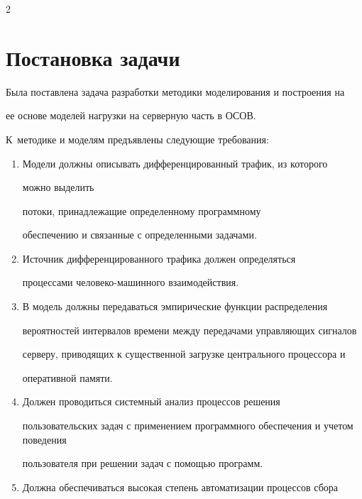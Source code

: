 \begin{multicols}{2}
\begin{figure}[b]
 \vspace*{-9pt}


\end{figure}

  

\section{Постановка задачи}

  

  Была поставлена задача разработки методики моделирования и построения на 

ее основе моделей нагрузки на серверную часть в ОСОВ. 

К~методике и моделям предъявлены следующие требования:

  \begin{enumerate}[1.]

\item Модели должны описывать дифференци\-ро\-ванный трафик, из которого 

можно выделить\linebreak

 потоки, принадлежащие определенному программному 

обеспечению и связанные с определенными задачами.

\item Источник дифференцированного трафика должен определяться 

процессами человеко-ма\-шин\-но\-го взаимодействия.

\item В модель должны передаваться эмпирические функции распределения 

вероятностей интервалов времени между передачами управляющих сигналов 

серверу, приводящих к существенной загрузке центрального процессора и 

оперативной памяти.

\item Должен проводиться системный анализ процессов решения 

пользовательских задач с применением программного обеспечения и учетом поведения 

пользователя при решении задач с по\-мощью программ.

\item Должна обеспечиваться высокая степень автоматизации процессов сбора 


\end{enumerate}
\end{multicols}
